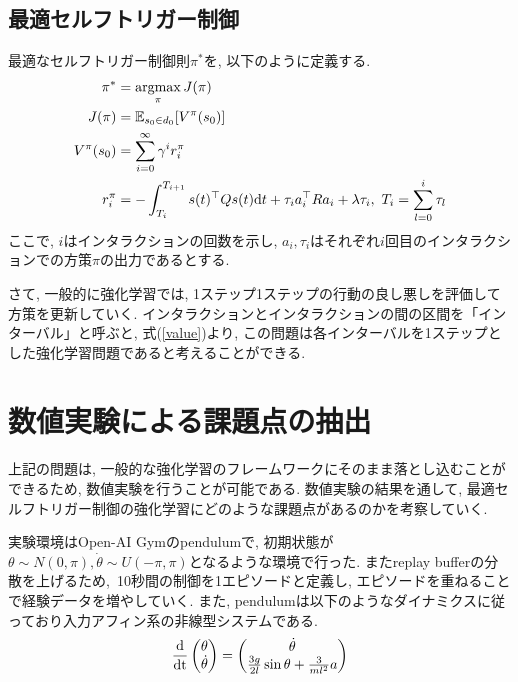 \documentclass{jsarticle}
\newcommand{\argmax}{\mathop{\rm argmax}\limits}
\newcommand{\expect}{\mathbb{E}}
\newcommand{\odif}[2]{\frac{\rm{d}#1}{\rm{d}#2}}
\begin{document}
\subsection{最適セルフトリガー制御}
最適なセルフトリガー制御則$\pi^{*}$を, 以下のように定義する. 
\begin{align}
	\pi^{*} &= \argmax_{\pi}J(\pi) \label{optimal_policy}\\
	J(\pi) &= \expect_{s_0\in d_0}[V^{\pi}(s_0)] \\
	V^{\pi}(s_0) &= \sum_{i=0}^{\infty} \gamma^i r^{\pi}_i \label{value} \\
	r^{\pi}_i &= -\int_{T_i}^{T_{i+1}}s(t)^{\top}Qs(t)\textrm{d}t +\tau_ia_i^{\top}Ra_i + \lambda \tau_i, ~T_i = \sum_{l=0}^{i} \tau_l \label{reward}
\end{align}
ここで, $i$はインタラクションの回数を示し, $a_i, \tau_i$はそれぞれ$i$回目のインタラクションでの方策$\pi$の出力であるとする. \par
さて, 一般的に強化学習では, 1ステップ1ステップの行動の良し悪しを評価して方策を更新していく. 
インタラクションとインタラクションの間の区間を「インターバル」と呼ぶと, 式(\ref{value})より, この問題は各インターバルを1ステップとした強化学習問題であると考えることができる. \par

\section{数値実験による課題点の抽出}
上記の問題は, 一般的な強化学習のフレームワークにそのまま落とし込むことができるため, 数値実験を行うことが可能である. 数値実験の結果を通して, 最適セルフトリガー制御の強化学習にどのような課題点があるのかを考察していく.\par
実験環境はOpen-AI Gymのpendulumで, 初期状態が$\theta\sim N(0, \pi), \dot{\theta}\sim U(-\pi,\pi)$となるような環境で行った. またreplay bufferの分散を上げるため,~10秒間の制御を1エピソードと定義し, エピソードを重ねることで経験データを増やしていく. また, pendulumは以下のようなダイナミクスに従っており入力アフィン系の非線型システムである.
\begin{equation}
	\odif{}{t}\begin{pmatrix}\theta \\ \dot{\theta}\end{pmatrix} = 
		\begin{pmatrix}\dot{\theta} \\ \frac{3g}{2l}\sin{\theta} + \frac{3}{ml^2}a \end{pmatrix} \label{pendulum}
\end{equation}
\end{document}
